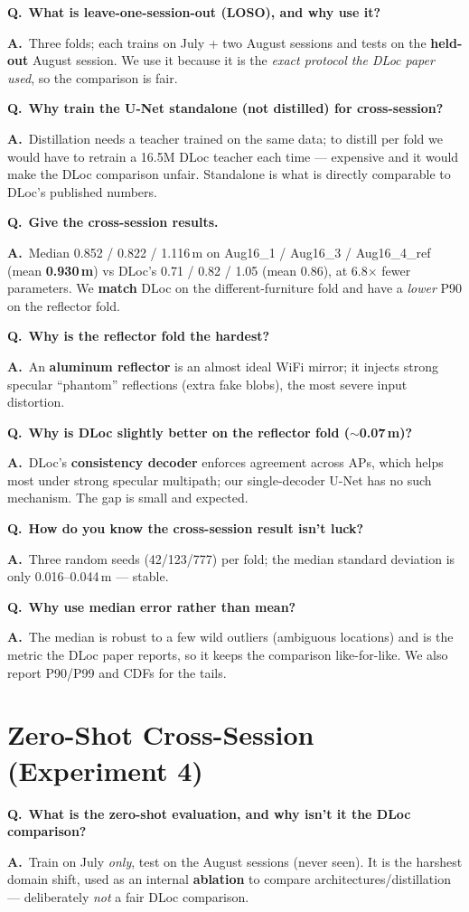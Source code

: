 \documentclass[11pt]{article}
\newcommand{\Q}[1]{\medskip\noindent\textbf{\textcolor{blue!50!black}{Q.}}\ \textbf{#1}\par\nopagebreak}
\newcommand{\A}{\noindent\textbf{A.}\ }
\begin{document}
\Q{What is leave-one-session-out (LOSO), and why use it?}
\A Three folds; each trains on July + two August sessions and tests on the \textbf{held-out} August
session. We use it because it is the \emph{exact protocol the DLoc paper used}, so the comparison is fair.

\Q{Why train the U-Net standalone (not distilled) for cross-session?}
\A Distillation needs a teacher trained on the same data; to distill per fold we would have to retrain a
16.5M DLoc teacher each time --- expensive and it would make the DLoc comparison unfair. Standalone is
what is directly comparable to DLoc's published numbers.

\Q{Give the cross-session results.}
\A Median 0.852 / 0.822 / 1.116\,m on Aug16\_1 / Aug16\_3 / Aug16\_4\_ref (mean \textbf{0.930\,m}) vs
DLoc's 0.71 / 0.82 / 1.05 (mean 0.86), at 6.8$\times$ fewer parameters. We \textbf{match} DLoc on the
different-furniture fold and have a \emph{lower} P90 on the reflector fold.

\Q{Why is the reflector fold the hardest?}
\A An \textbf{aluminum reflector} is an almost ideal WiFi mirror; it injects strong specular ``phantom''
reflections (extra fake blobs), the most severe input distortion.

\Q{Why is DLoc slightly better on the reflector fold ($\sim$0.07\,m)?}
\A DLoc's \textbf{consistency decoder} enforces agreement across APs, which helps most under strong
specular multipath; our single-decoder U-Net has no such mechanism. The gap is small and expected.

\Q{How do you know the cross-session result isn't luck?}
\A Three random seeds (42/123/777) per fold; the median standard deviation is only 0.016--0.044\,m ---
stable.

\Q{Why use median error rather than mean?}
\A The median is robust to a few wild outliers (ambiguous locations) and is the metric the DLoc paper
reports, so it keeps the comparison like-for-like. We also report P90/P99 and CDFs for the tails.

\section{Zero-Shot Cross-Session (Experiment 4)}

\Q{What is the zero-shot evaluation, and why isn't it the DLoc comparison?}
\A Train on July \emph{only}, test on the August sessions (never seen). It is the harshest domain shift,
used as an internal \textbf{ablation} to compare architectures/distillation --- deliberately \emph{not} a
fair DLoc comparison.
\end{document}
